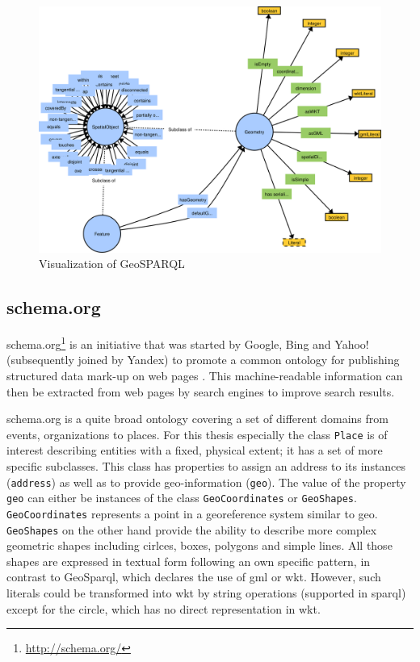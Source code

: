 \documentclass[draft,final]{vutinfth} %
\begin{document}
\begin{figure}[h]
    \centering
    \includegraphics[width=1.0\textwidth]{graphics/vocabularies/geosparql.png}
    \caption{Visualization of GeoSPARQL}
    \label{fig:related-work-geospatial-ontologies:geosparql}
\end{figure}

\subsection{schema.org}
schema.org\footnote{\url{http://schema.org/}} is an initiative that was started by Google, Bing and Yahoo! (subsequently joined by Yandex) to promote a common ontology for publishing structured data mark-up on web pages \cite{guha_introducing_2011}. This machine-readable information can then be extracted from web pages by search engines to improve search results.

schema.org is a quite broad ontology covering a set of different domains from events, organizations to places. For this thesis especially the class \texttt{Place} is of interest describing entities with a fixed, physical extent; it has a set of more specific subclasses. This class has properties to assign an address to its instances  (\texttt{address}) as well as to provide geo-information (\texttt{geo}). The value of the property \texttt{geo} can either be instances of the class \texttt{GeoCoordinates} or \texttt{GeoShapes}. \texttt{GeoCoordinates} represents a point in a georeference system similar to \gls{geo}. \texttt{GeoShapes} on the other hand provide the ability to describe more complex geometric shapes including cirlces, boxes, polygons and simple lines. All those shapes are expressed in textual form following an own specific pattern, in contrast to GeoSparql, which declares the use of \gls{gml} or \gls{wkt}. However, such literals could be transformed into \gls{wkt} by string operations (supported in \gls{sparql}) except for the circle, which has no direct representation in \gls{wkt}.
\end{document}
